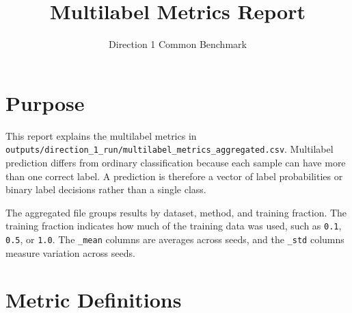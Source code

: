 \documentclass[11pt]{article}
\title{Multilabel Metrics Report}
\author{Direction 1 Common Benchmark}
\date{}
\begin{document}
\maketitle

\section{Purpose}

This report explains the multilabel metrics in
\texttt{outputs/direction\_1\_run/multilabel\_metrics\_aggregated.csv}.
Multilabel prediction differs from ordinary classification because each sample
can have more than one correct label. A prediction is therefore a vector of
label probabilities or binary label decisions rather than a single class.

The aggregated file groups results by dataset, method, and training fraction.
The training fraction indicates how much of the training data was used, such as
\texttt{0.1}, \texttt{0.5}, or \texttt{1.0}. The \texttt{\_mean} columns are
averages across seeds, and the \texttt{\_std} columns measure variation across
seeds.

\section{Metric Definitions}
\end{document}
